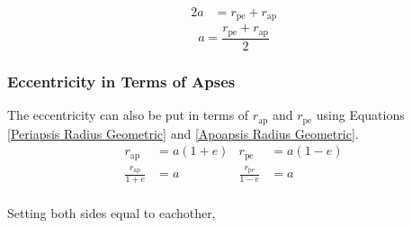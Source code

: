 \documentclass[../main.tex]{subfiles}
\begin{document}
\begin{align*}
    2a & = r_\text{pe}+r_\text{ap}
\end{align*}
\begin{equation}\label{SMA in terms of apses}
    a = \frac{r_\text{pe}+r_\text{ap}}{2}
\end{equation}

\subsubsection{Eccentricity in Terms of Apses}

The eccentricity can also be put in terms of $r_\text{ap}$ and $r_\text{pe}$ using Equations \eqref{Periapsis Radius Geometric} and \eqref{Apoapsis Radius Geometric}.
\begin{align*}
    r_\text{ap}             & =a(1+e) & r_\text{pe}             & =a(1-e) \\
    \frac{r_\text{ap}}{1+e} & =a      & \frac{r_\text{pe}}{1-e} & =a      \\
\end{align*}

Setting both sides equal to eachother,
\end{document}
